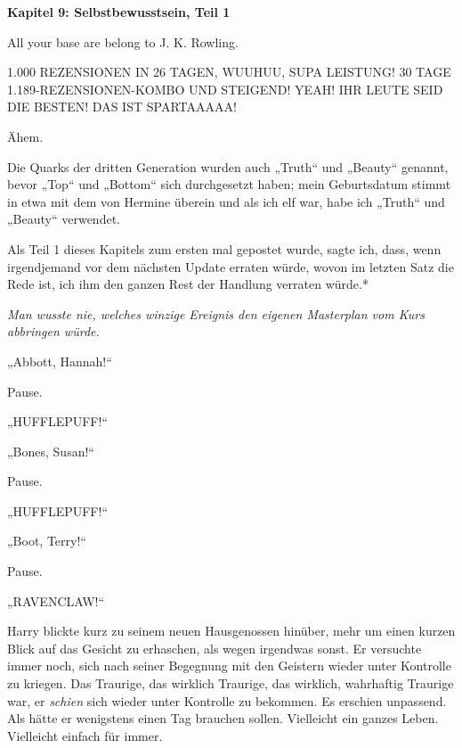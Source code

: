

\hypertarget{selbstbewusstsein-teil-1}{%

\textbf{Kapitel 9: Selbstbewusstsein, Teil 1}

All your base are belong to J. K. Rowling.

\later

1.000 REZENSIONEN IN 26 TAGEN, WUUHUU, SUPA LEISTUNG! 30 TAGE 1.189-REZENSIONEN-KOMBO UND STEIGEND! YEAH! IHR LEUTE SEID DIE BESTEN! DAS IST SPARTAAAAA!

Ähem.

Die Quarks der dritten Generation wurden auch „Truth“ und „Beauty“ genannt, bevor „Top“ und „Bottom“ sich durchgesetzt haben; mein Geburtsdatum stimmt in etwa mit dem von Hermine überein und als ich elf war, habe ich „Truth“ und „Beauty“ verwendet.

Als Teil 1 dieses Kapitels zum ersten mal gepostet wurde, sagte ich, dass, wenn irgendjemand vor dem nächsten Update erraten würde, wovon im letzten Satz die Rede ist, ich ihm den ganzen Rest der Handlung verraten würde.*

\later

\emph{Man wusste nie, welches winzige Ereignis den eigenen Masterplan vom Kurs abbringen würde.}

\later

„Abbott, Hannah!“

Pause.

„HUFFLEPUFF!“

„Bones, Susan!“

Pause.

„HUFFLEPUFF!“

„Boot, Terry!“

Pause.

„RAVENCLAW!“

Harry blickte kurz zu seinem neuen Hausgenossen hinüber, mehr um einen kurzen Blick auf das Gesicht zu erhaschen, als wegen irgendwas sonst. Er versuchte immer noch, sich nach seiner Begegnung mit den Geistern wieder unter Kontrolle zu kriegen. Das Traurige, das wirklich Traurige, das wirklich, wahrhaftig Traurige war, er \emph{schien} sich wieder unter Kontrolle zu bekommen. Es erschien unpassend. Als hätte er wenigstens einen Tag brauchen sollen. Vielleicht ein ganzes Leben. Vielleicht einfach für immer.

}
